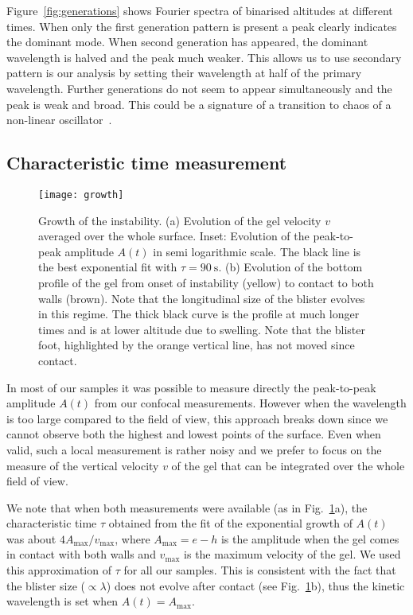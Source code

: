 \documentclass[twocolumn,superscriptaddress,showpacs,preprintnumbers,
amsmath,amssymb,prl]{revtex4-1}
\begin{document}
Figure~\ref{fig:generations} shows Fourier spectra of binarised altitudes at different times. When only the first generation pattern is present a peak clearly indicates the dominant mode. When second generation has appeared, the dominant wavelength is halved and the peak much weaker. This allows us to use secondary pattern is our analysis by setting their wavelength at half of the primary wavelength. Further generations do not seem to appear simultaneously and the peak is weak and broad. This could be a signature of a transition to chaos of a non-linear oscillator~\cite{Brau2011}.

\subsection*{Characteristic time measurement}
\begin{figure}
	\texttt{[image: growth]}
	\caption{Growth of the instability. (a) Evolution of the gel velocity $v$ averaged over the whole surface. Inset: Evolution of the peak-to-peak amplitude $A(t)$ in semi logarithmic scale. The black line is the best exponential fit with $\tau=\SI{90}{\second}$. (b) Evolution of the bottom profile of the gel from onset of instability (yellow) to contact to both walls (brown). Note that the longitudinal size of the blister evolves in this regime. The thick black curve is the profile at much longer times and is at lower altitude due to swelling. Note that the blister foot, highlighted by the orange vertical line, has not moved since contact.}
	\label{fig:growth}
\end{figure}

In most of our samples it was possible to measure directly the peak-to-peak amplitude $A(t)$ from our confocal measurements. However when the wavelength is too large compared to the field of view, this approach breaks down since we cannot observe both the highest and lowest points of the surface. Even when valid, such a local measurement is rather noisy and we prefer to focus on the measure of the vertical velocity $v$ of the gel that can be integrated over the whole field of view.

We note that when both measurements were available (as in Fig.~\ref{fig:growth}a), the characteristic time $\tau$ obtained from the fit of the exponential growth of $A(t)$ was about $4A_\text{max}/v_\text{max}$, where $A_\text{max} = e-h$ is the amplitude when the gel comes in contact with both walls and $v_\text{max}$ is the maximum velocity of the gel. We used this approximation of $\tau$ for all our samples. This is consistent with the fact that the blister size ($\propto\lambda$) does not evolve after contact (see Fig.~\ref{fig:growth}b), thus the kinetic wavelength is set when $A(t) = A_\text{max}$.
\end{document}
